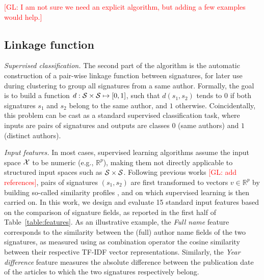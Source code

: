 \documentclass{article}
\newcommand{\glnote}[1]{\textcolor{red}{[GL: #1]}}
\begin{document}
\glnote{I am not sure we need an explicit algorithm, but adding a few examples would help.}

\subsection{Linkage function}
\label{methods:linkage}

\textit{Supervised classification.} The second part of the algorithm is the
automatic construction of a pair-wise linkage function between signatures, for
later use during clustering to group all signatures from a same author.
Formally, the goal is to build a function $d: {\cal S} \times {\cal S} \mapsto
[0, 1]$, such that $d(s_1, s_2)$ tends to $0$ if both signatures $s_1$ and
$s_2$ belong to the same author, and $1$ otherwise. Coincidentally, this
problem can be cast as a standard supervised classification task, where inputs
are pairs of signatures and outputs are classes $0$ (same authors) and $1$
(distinct authors).

\textit{Input features.} In most cases, supervised learning algorithms assume
the input space ${\cal X}$ to be numeric (e.g., $\mathbb{R}^p$), making them
not directly applicable to structured input spaces such as ${\cal S} \times
{\cal S}$. Following previous works \glnote{add references}, pairs of
signatures $(s_1, s_2)$ are first transformed to vectors $v \in \mathbb{R}^p$
by building so-called similarity profiles
\citep{treeratpituk2009disambiguating}, and on which supervised learning is
then carried on. In this work, we design and evaluate 15 standard input
features based on the comparison of signature fields, as reported in the first
half of Table~\ref{table:features}. As an illustrative example, the
\textit{Full name} feature corresponds to the similarity between the (full)
author name fields of the two signatures, as measured using as combination
operator the cosine similarity between their respective TF-IDF vector
representations. Similarly, the \textit{Year difference} feature measures the
absolute difference between the publication date of the articles to which the
two signatures respectively belong.
\end{document}
